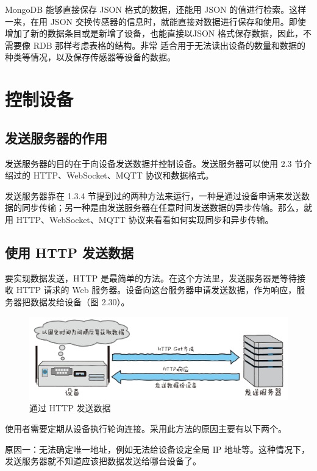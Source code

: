 \documentclass[12pt,UTF8]{ctexbook}
\begin{document}
MongoDB 能够直接保存 JSON 格式的数据，还能用 JSON 的值进行检索。这样一来，在用 JSON 交换传感器的信息时，就能直接对数据进行保存和使用。即使增加了新的数据条目或是新增了设备，也能直接以JSON 格式保存数据，因此，不需要像 RDB 那样考虑表格的结构。非常
适合用于无法读出设备的数量和数据的种类等情况，以及保存传感器等设备的数据。

\section{控制设备}

\subsection{发送服务器的作用}

发送服务器的目的在于向设备发送数据并控制设备。发送服务器可以使用 2.3 节介绍过的 HTTP、WebSocket、MQTT 协议和数据格式。

发送服务器靠在 1.3.4 节提到过的两种方法来运行，一种是通过设备申请来发送数据的同步传输；另一种是由发送服务器在任意时间发送数据的异步传输。那么，就用 HTTP、WebSocket、MQTT 协议来看看如何实现同步和异步传输。

\subsection{使用 HTTP 发送数据}

要实现数据发送，HTTP 是最简单的方法。在这个方法里，发送服务器是等待接收 HTTP 请求的 Web 服务器。设备向这台服务器申请发送数据，作为响应，服务器把数据发给设备（图 2.30）。

\begin{figure}[htbp]
	\centering
	\includegraphics[width=1\linewidth]{49}
	\caption{通过 HTTP 发送数据}
	\label{fig:1}
\end{figure}

使用者需要定期从设备执行轮询连接。采用此方法的原因主要有以下两个。

原因一：无法确定唯一地址，例如无法给设备设定全局 IP 地址等。这种情况下，发送服务器就不知道应该把数据发送给哪台设备了。
\end{document}
